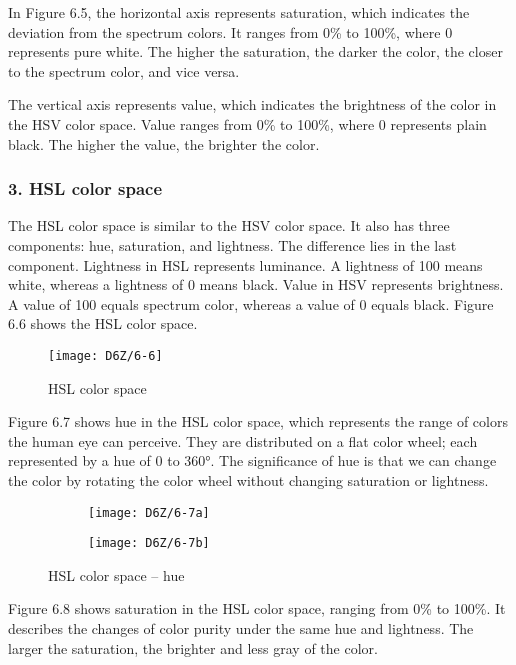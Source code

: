 \documentclass[a4paper,12pt]{book}
\begin{document}
In Figure 6.5, the horizontal axis represents saturation, which indicates the deviation from the spectrum colors. It ranges from 0\% to 100\%, where 0 represents pure white. The higher the saturation, the darker the color, the closer to the spectrum color, and vice versa.

The vertical axis represents value, which indicates the brightness of the color in the HSV color space. Value ranges from 0\% to 100\%, where 0 represents plain black. The higher the value, the brighter the color.

\subsubsection{3. HSL color space}
The HSL color space is similar to the HSV color space. It also has three components: hue, saturation, and lightness. The difference lies in the last component. Lightness in HSL represents luminance. A lightness of 100 means white, whereas a lightness of 0 means black. Value in HSV represents brightness. A value of 100 equals spectrum color, whereas a value of 0 equals black. Figure 6.6 shows the HSL color space.

\begin{figure}[h!]
    \centering
    \texttt{[image: D6Z/6-6]}
    \caption{HSL color space}
\end{figure}

Figure 6.7 shows hue in the HSL color space, which represents the range of colors the human eye can perceive. They are distributed on a flat color wheel; each represented by a hue of 0 to 360°. The significance of hue is that we can change the color by rotating the color wheel without changing saturation or lightness.

\begin{figure}[h!]
    \Centering
    \begin{subfigure}{0.4\textwidth}
        \RaggedLeft
        \texttt{[image: D6Z/6-7a]} 
    \end{subfigure}\hspace{1em}
    \begin{subfigure}{0.4\textwidth}
        \RaggedRight
        \texttt{[image: D6Z/6-7b]}
    \end{subfigure}
    \caption{HSL color space – hue}
\end{figure}

Figure 6.8 shows saturation in the HSL color space, ranging from 0\% to 100\%. It describes the changes of color purity under the same hue and lightness. The larger the saturation, the brighter and less gray of the color.
\end{document}
